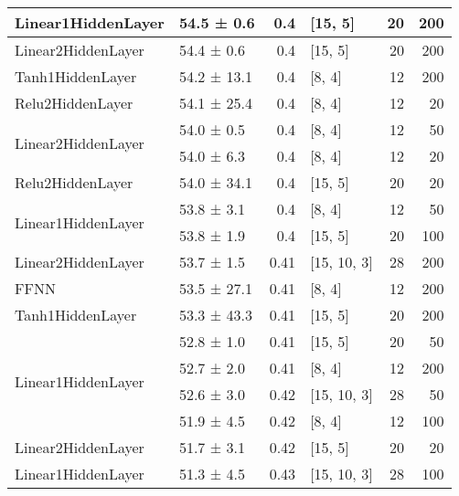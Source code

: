 \begin{table*}[h]
\begin{tabular}{llrlrr}
 \hline
Linear1HiddenLayer                  & 54.5 ± 0.6  &  0.4  & [15, 5]        &         20 &      200 \\
 \hline
Linear2HiddenLayer                  & 54.4 ± 0.6  &  0.4  & [15, 5]        &         20 &      200 \\
 \hline
Tanh1HiddenLayer                    & 54.2 ± 13.1 &  0.4  & [8, 4]         &         12 &      200 \\
 \hline
Relu2HiddenLayer                    & 54.1 ± 25.4 &  0.4  & [8, 4]         &         12 &       20 \\
 \hline
\multirow{2}{*}{Linear2HiddenLayer} & 54.0 ± 0.5  &  0.4  & [8, 4]         &         12 &       50 \\
                                            & 54.0 ± 6.3  &  0.4  & [8, 4]         &         12 &       20 \\
 \hline
Relu2HiddenLayer                    & 54.0 ± 34.1 &  0.4  & [15, 5]        &         20 &       20 \\
 \hline
\multirow{2}{*}{Linear1HiddenLayer} & 53.8 ± 3.1  &  0.4  & [8, 4]         &         12 &       50 \\
                                            & 53.8 ± 1.9  &  0.4  & [15, 5]        &         20 &      100 \\
 \hline
Linear2HiddenLayer                  & 53.7 ± 1.5  &  0.41 & [15, 10, 3]    &         28 &      200 \\
 \hline
FFNN                                & 53.5 ± 27.1 &  0.41 & [8, 4]         &         12 &      200 \\
 \hline
Tanh1HiddenLayer                    & 53.3 ± 43.3 &  0.41 & [15, 5]        &         20 &      200 \\
 \hline
\multirow{4}{*}{Linear1HiddenLayer} & 52.8 ± 1.0  &  0.41 & [15, 5]        &         20 &       50 \\
                                            & 52.7 ± 2.0  &  0.41 & [8, 4]         &         12 &      200 \\
                                            & 52.6 ± 3.0  &  0.42 & [15, 10, 3]    &         28 &       50 \\
                                            & 51.9 ± 4.5  &  0.42 & [8, 4]         &         12 &      100 \\
 \hline
Linear2HiddenLayer                  & 51.7 ± 3.1  &  0.42 & [15, 5]        &         20 &       20 \\
 \hline
Linear1HiddenLayer                  & 51.3 ± 4.5  &  0.43 & [15, 10, 3]    &         28 &      100 \\

\end{tabular}
\end{table*}
